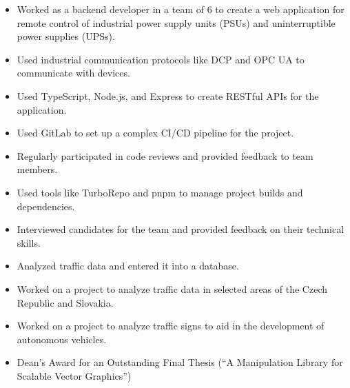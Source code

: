 \documentclass[10pt,a4paper,ragged2e,withhyper]{altacv}
\begin{document}


\makecvheader
\vspace{1cm}

\begin{paracol}{2}

	\begin{itemize}
		\item Worked as a backend developer in a team of 6 to create a web application for remote control of industrial power supply units (PSUs) and uninterruptible power supplies (UPSs).
		\item Used industrial communication protocols like DCP and OPC UA to communicate with devices.
		\item Used TypeScript, Node.js, and Express to create RESTful APIs for the application.
		\item Used GitLab to set up a complex CI/CD pipeline for the project.
		\item Regularly participated in code reviews and provided feedback to team members.
		\item Used tools like TurboRepo and pnpm to manage project builds and dependencies.
		\item Interviewed candidates for the team and provided feedback on their technical skills.
	\end{itemize}

	\divider

	\begin{itemize}
		\item Analyzed traffic data and entered it into a database.
		\item Worked on a project to analyze traffic data in selected areas of the Czech Republic and Slovakia.
		\item Worked on a project to analyze traffic signs to aid in the development of autonomous vehicles.
	\end{itemize}

	\bigskip

	\begin{itemize}
		\item Dean's Award for an Outstanding Final Thesis (\enquote{A Manipulation Library for Scalable Vector Graphics})
	\end{itemize}


\end{paracol}
\end{document}
